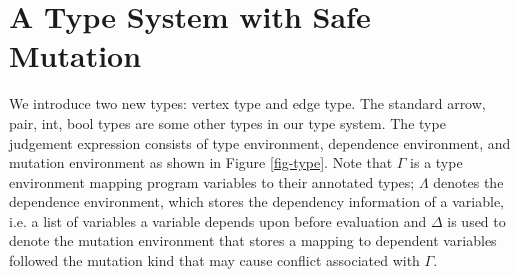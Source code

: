 \section{A Type System with Safe Mutation}
\label{sec:types}

We introduce two new types: vertex type and edge type. The standard arrow, pair, int, bool types are some other types in our type system. The type judgement expression consists of type environment, dependence environment, and mutation environment as shown in Figure \ref{fig-type}. Note that $\Gamma$ is a type environment mapping program variables to their annotated types; $\Lambda$ denotes the dependence environment, which stores the dependency information of a variable, i.e. a list of variables a variable depends upon before evaluation and $\Delta$ is used to denote the mutation environment that stores a mapping to dependent variables followed the mutation kind that may cause conflict associated with $\Gamma$. 

